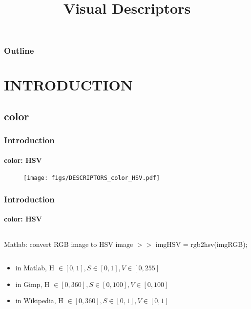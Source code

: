 
\title{Visual Descriptors}
\begin{frame}[plain]\logoTechTower
	\titlepage
\end{frame}

\begin{frame}
\frametitle{Outline}
\logoCSIPCPL\logoTechTower
	\setcounter{tocdepth}{1}	
	\tableofcontents
\end{frame}

\section{INTRODUCTION}
\subsection{color}
\begin{frame}
\frametitle{Introduction}
\framesubtitle{color: HSV}
\mypagenum
{}
	\begin{figure}
		\texttt{[image: figs/DESCRIPTORS\_color\_HSV.pdf]}
	\end{figure}
\end{frame}


\begin{frame}
\frametitle{Introduction}
\framesubtitle{color: HSV}
\mypagenum
	\begin{columns}
		\begin{column}{3in}
			\begin{block}{Matlab: convert RGB image to HSV image}
				$>>$ imgHSV = rgb2hsv(imgRGB);  
			\end{block}
		\end{column}
	\end{columns}
	\begin{itemize}
		\item in Matlab, H $\in [0,1], S \in [0,1], V \in [0,255]$
		\item in Gimp, H $\in [0,360], S \in [0,100], V \in [0,100]$
		\item in Wikipedia, H $\in [0,360], S \in [0,1], V \in [0,1]$
	\end{itemize}
\end{frame}


